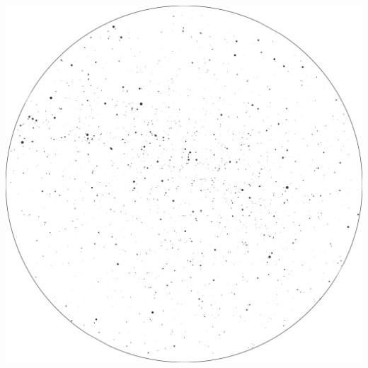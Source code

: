\documentclass{./SAS-class-skygen}
\begin{document}
	\vspace{0.5cm}
    \begin{center}
    \includegraphics[width=\textwidth]{./pics/skychart11.png}
    \end{center}
    
    
\end{document}
